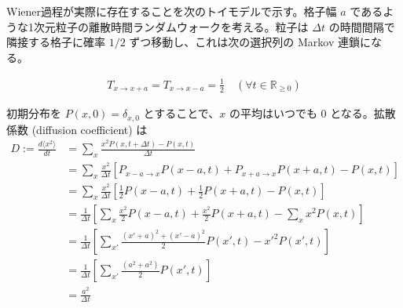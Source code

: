 \documentclass[a4paper,11pt]{jsarticle}
\numberwithin{equation}{section}
\begin{document}
Wiener過程が実際に存在することを次のトイモデルで示す。格子幅 $a$ であるような1次元粒子の離散時間ランダムウォークを考える。粒子は $\Delta t$ の時間間隔で隣接する格子に確率 $1/2$ ずつ移動し、これは次の選択列の Markov 連鎖になる。

\begin{align}
    T_{x \to x+a} = T_{x \to x-a} = \frac{1}{2} \quad (\forall t \in \mathbb{R}_{\geq 0}) 
\end{align}

初期分布を $P(x, 0) = \delta_{x,0}$ とすることで、$x$ の平均はいつでも 0 となる。拡散係数 (diffusion coefficient) は
\begin{align}
    D := \frac{d\langle x^2 \rangle}{dt}
    &= \sum_x \frac{x^2 P(x, t + \Delta t) - P(x,t)}{\Delta t}  \\
    &= \sum_x \frac{x^2}{\Delta t} \left[ P_{x-a \to x} P(x-a, t) + P_{x+a \to x} P(x+a, t) - P(x,t) \right] \\
    &= \sum_x \frac{x^2}{\Delta t} \left[ \frac{1}{2} P(x-a,t) + \frac{1}{2} P(x+a,t) - P(x,t) \right]  \\
    &= \frac{1}{\Delta t} \left[ \sum_x \frac{x^2}{2} P(x-a,t) + \frac{x^2}{2} P(x+a,t) - \sum_x x^2 P(x,t) \right]  \\
    &= \frac{1}{\Delta t} \left[ \sum_{x'} \frac{(x'+a)^2 + (x'-a)^2}{2} P(x',t) - x'^2 P(x',t) \right]  \\
    &= \frac{1}{\Delta t} \left[ \sum_{x'} \frac{(a^2 + a^2)}{2} P(x',t) \right]  \\
    &= \frac{a^2}{\Delta t} 
\end{align}
\end{document}

